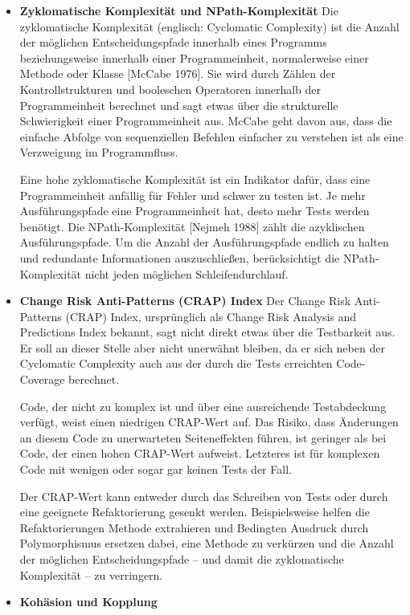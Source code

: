 \begin{itemize}
	\item \textbf{Zyklomatische Komplexität und NPath-Komplexität}
	Die zyklomatische Komplexität (englisch: Cyclomatic Complexity) ist die Anzahl der möglichen Entscheidungspfade 
	innerhalb eines Programms beziehungsweise innerhalb einer Programmeinheit, normalerweise einer Methode oder Klasse [McCabe 1976]. 
	Sie wird durch Zählen der Kontrollstrukturen und booleschen Operatoren innerhalb der Programmeinheit 
	berechnet und sagt etwas über die strukturelle Schwierigkeit einer Programmeinheit aus. McCabe geht davon aus, 
	dass die einfache Abfolge von sequenziellen Befehlen einfacher zu verstehen ist als eine Verzweigung im Programmfluss.

	Eine hohe zyklomatische Komplexität ist ein Indikator dafür, dass eine Programmeinheit
	anfällig für Fehler und schwer zu testen ist. Je mehr Ausführungspfade eine Programmeinheit hat, 
	desto mehr Tests werden benötigt. Die NPath-Komplexität [Nejmeh 1988] zählt die azyklischen Ausführungspfade. 
	Um die Anzahl der Ausführungspfade endlich zu halten und redundante Informationen auszuschließen, berücksichtigt die NPath-Komplexität
	nicht jeden möglichen Schleifendurchlauf.
	
	\item \textbf{Change Risk Anti-Patterns (CRAP) Index}
	Der Change Risk Anti-Patterns (CRAP) Index, ursprünglich als Change Risk Analysis and Predictions Index bekannt, 
	sagt nicht direkt etwas über die Testbarkeit aus. Er soll an dieser Stelle aber nicht unerwähnt bleiben, da er sich 
	neben der Cyclomatic Complexity auch aus der durch die Tests erreichten Code-Coverage berechnet.
	
	Code, der nicht zu komplex ist und über eine ausreichende Testabdeckung verfügt, weist
	einen niedrigen CRAP-Wert auf. Das Risiko, dass Änderungen an diesem Code zu unerwarteten 
	Seiteneffekten führen, ist geringer als bei Code, der einen hohen CRAP-Wert aufweist.
	Letzteres ist für komplexen Code mit wenigen oder sogar gar keinen Tests der Fall.
	
	Der CRAP-Wert kann entweder durch das Schreiben von Tests oder durch eine geeignete Refaktorierung 
	gesenkt werden. Beispielsweise helfen die Refaktorierungen Methode extrahieren und Bedingten Ausdruck 
	durch Polymorphismus ersetzen dabei, eine Methode zu verkürzen und die Anzahl der möglichen 
	Entscheidungspfade – und damit die zyklomatische Komplexität – zu verringern.
	
	\item \textbf{Kohäsion und Kopplung}
	

\end{itemize}

